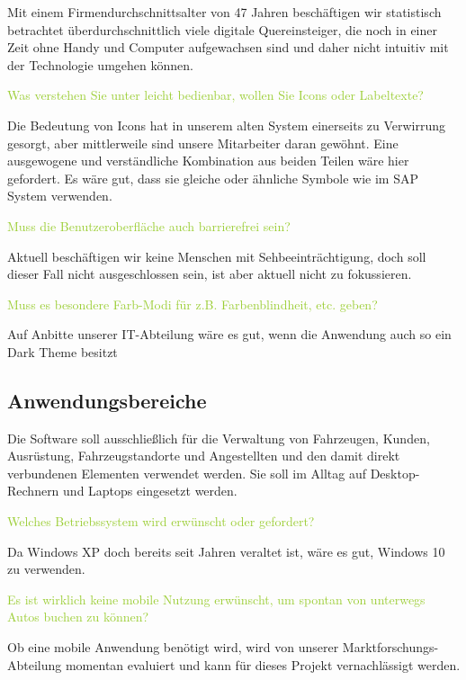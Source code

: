 \textcolor{NavyBlue}{Mit einem Firmendurchschnittsalter von 47 Jahren beschäftigen wir statistisch betrachtet überdurchschnittlich viele digitale Quereinsteiger, die noch in einer Zeit ohne Handy und Computer aufgewachsen sind und daher nicht intuitiv mit der Technologie umgehen können. }

\textcolor{YellowGreen}{Was verstehen Sie unter leicht bedienbar, wollen Sie Icons oder Labeltexte?}

\textcolor{NavyBlue}{Die Bedeutung von Icons hat in unserem alten System einerseits zu Verwirrung gesorgt, aber mittlerweile sind unsere Mitarbeiter daran gewöhnt. Eine ausgewogene und verständliche Kombination aus beiden Teilen wäre hier gefordert. Es wäre gut, dass sie gleiche oder ähnliche Symbole wie im SAP System verwenden.}

\textcolor{YellowGreen}{Muss die Benutzeroberfläche auch barrierefrei sein?}

\textcolor{NavyBlue}{Aktuell beschäftigen wir keine Menschen mit Sehbeeinträchtigung, doch soll dieser Fall nicht ausgeschlossen sein, ist aber aktuell nicht zu fokussieren.}

\textcolor{YellowGreen}{Muss es besondere Farb-Modi für z.B. Farbenblindheit, etc. geben?}

\textcolor{NavyBlue}{Auf Anbitte unserer IT-Abteilung wäre es gut, wenn die Anwendung auch so ein \grqq{}Dark Theme\grqq{} besitzt}

\subsection{Anwendungsbereiche}

Die Software soll ausschließlich für die Verwaltung von Fahrzeugen, Kunden, Ausrüstung, Fahrzeugstandorte und Angestellten und den damit direkt verbundenen Elementen verwendet werden. 
Sie soll im Alltag auf Desktop-Rechnern und Laptops eingesetzt werden.  

\textcolor{YellowGreen}{Welches Betriebssystem wird erwünscht oder gefordert?}

\textcolor{NavyBlue}{Da Windows XP doch bereits seit Jahren veraltet ist, wäre es gut, Windows 10 zu verwenden.}

\textcolor{YellowGreen}{Es ist wirklich keine mobile Nutzung erwünscht, um spontan von unterwegs Autos buchen zu können?}

\textcolor{NavyBlue}{Ob eine mobile Anwendung benötigt wird, wird von unserer Marktforschungs-Abteilung momentan evaluiert und kann für dieses Projekt vernachlässigt werden.}

